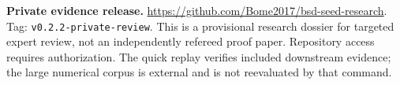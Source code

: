 \documentclass[11pt]{amsart}
\theoremstyle{plain}
\theoremstyle{definition}
\theoremstyle{remark}
\begin{document}
\maketitle
\noindent\textbf{Private evidence release.}
\url{https://github.com/Bome2017/bsd-seed-research}.
Tag: \texttt{v0.2.2-private-review}.
This is a provisional research dossier for targeted expert review, not an independently refereed proof paper. Repository access requires authorization. The quick replay verifies included downstream evidence; the large numerical corpus is external and is not reevaluated by that command.


\tableofcontents












\appendix









\end{document}
